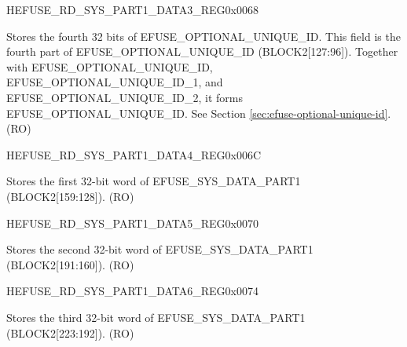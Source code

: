 \begin{register}{H}{EFUSE\_RD\_SYS\_PART1\_DATA3\_REG}{0x0068}\label{regdesc:EFUSERDSYSPART1DATA3REG}
%
\regnewline%
\begin{regdesc}\begin{reglist}
\label{fielddesc:EFUSEOPTIONALUNIQUEID3}\item [EFUSE\_OPTIONAL\_UNIQUE\_ID\_3] Stores the fourth 32 bits of EFUSE\_OPTIONAL\_UNIQUE\_ID. This field is the fourth part of EFUSE\_OPTIONAL\_UNIQUE\_ID (BLOCK2[127:96]). Together with EFUSE\_OPTIONAL\_UNIQUE\_ID, EFUSE\_OPTIONAL\_UNIQUE\_ID\_1, and EFUSE\_OPTIONAL\_UNIQUE\_ID\_2, it forms EFUSE\_OPTIONAL\_UNIQUE\_ID. See Section \ref{sec:efuse-optional-unique-id}. (RO)
\end{reglist}\end{regdesc}
\end{register}


\begin{register}{H}{EFUSE\_RD\_SYS\_PART1\_DATA4\_REG}{0x006C}\label{regdesc:EFUSERDSYSPART1DATA4REG}
%
\regnewline%
\begin{regdesc}\begin{reglist}
\label{fielddesc:EFUSESYSDATAPART14}\item [EFUSE\_SYS\_DATA\_PART1\_4] Stores the first 32-bit word of EFUSE\_SYS\_DATA\_PART1 (BLOCK2[159:128]). (RO)
\end{reglist}\end{regdesc}
\end{register}


\begin{register}{H}{EFUSE\_RD\_SYS\_PART1\_DATA5\_REG}{0x0070}\label{regdesc:EFUSERDSYSPART1DATA5REG}
%
\regnewline%
\begin{regdesc}\begin{reglist}
\label{fielddesc:EFUSESYSDATAPART15}\item [EFUSE\_SYS\_DATA\_PART1\_5] Stores the second 32-bit word of EFUSE\_SYS\_DATA\_PART1 (BLOCK2[191:160]). (RO)
\end{reglist}\end{regdesc}
\end{register}


\begin{register}{H}{EFUSE\_RD\_SYS\_PART1\_DATA6\_REG}{0x0074}\label{regdesc:EFUSERDSYSPART1DATA6REG}
%
\regnewline%
\begin{regdesc}\begin{reglist}
\label{fielddesc:EFUSESYSDATAPART16}\item [EFUSE\_SYS\_DATA\_PART1\_6] Stores the third 32-bit word of EFUSE\_SYS\_DATA\_PART1 (BLOCK2[223:192]). (RO)
\end{reglist}\end{regdesc}
\end{register}


